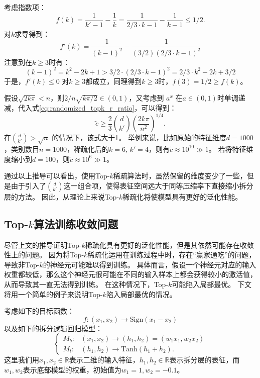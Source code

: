 考虑指数项：
\begin{equation}
    f(k) = \dfrac{1}{k' - 1} - \dfrac{1}{k} = \dfrac{1}{2/3 \cdot k - 1} - \dfrac{1}{k - 1} \le 1/2.
\end{equation}
%
对$k$求导得到：
\begin{equation}
    f'(k) = \dfrac{1}{(k - 1)^2} - \dfrac{1}{(3/2)(2/3 \cdot k - 1)^2}
\end{equation}
%
注意到在$k \ge 3$时有：
\begin{equation}
    (k - 1)^2 = k^2 - 2k + 1 > 3/2 \cdot (2/3\cdot k - 1)^2 = 2/3 \cdot k^2 -2k + 3/2
\end{equation}
%
于是，$f'(k) \le 0$ 对$k \ge 3$都成立，同理得到$k \ge 3$时，$f(3) = 1/2 \ge f(k)$。
%



假设$\sqrt{2k\pi} < n$，则$2/n \sqrt{k\pi/2} \in (0, 1)$，又考虑到 $a^x$ 在$a \in (0, 1)$时单调递减，代入式\eqref{eq:randomized_topk_r_ratio}，可以得到：
\begin{equation}
    \tilde c \ge \dfrac23 {d \choose k'} \left(\dfrac{2k\pi}{n^2}\right)^{1/4}.
\end{equation}
%
在${d \choose k'} > \sqrt{n}$ 的情况下，该式大于1。
%
举例来说，比如原始的特征维度$d = 1000$，类别数目$n = 1000$，稀疏化后的$k = 6$, $k' = 4$，则有$\tilde c \approx 10^{10} \gg 1$。
%
若将特征维度缩小到$d = 100$，则$\tilde c \approx 10^6 \gg 1$。
%

通过以上推导可以看出，使用Top-$k$稀疏算法时，虽然保留的维度变少了一些，但是由于引入了${d \choose k'}$这一组合项，使得表征空间远大于同等压缩率下直接缩小拆分层的方法。
%
因此，从理论上来说Top-$k$稀疏化将使模型具有更好的泛化性能。
%


\subsection{Top-$k$算法训练收敛问题}
尽管上文的推导证明Top-$k$稀疏化具有更好的泛化性能，但是其依然可能存在收敛性上的问题。
因为将Top-$k$稀疏化运用在训练过程中时，存在“赢家通吃”的问题，导致非Top-$k$的神经元可能难以得到训练。
%
具体而言，假设一个神经元对应的输入权重都较低，那么这个神经元很可能在不同的输入样本上都会获得较小的激活值，从而导致其一直无法得到训练。
%
在这种情况下，Top-$k$可能陷入局部最优。
%
下文将用一个简单的例子来说明Top-$k$陷入局部最优的情况。

考虑如下的目标函数：
\begin{equation}
    f: (x_1, x_2) \to \text{Sign}(x_1 - x_2)
\end{equation}
以及如下的拆分逻辑回归模型：
\begin{equation}
\begin{cases}
    M_b: & (x_1, x_2) \to (h_1, h_2) = (w_1x_1, w_2x_2) \\
    M_t: & (h_1, h_2)\rightarrow \text{Tanh}(h_1 + h_2).
\end{cases}
\end{equation}
这里我们用$x_1, x_2 \in \mathbb R$表示二维的输入特征，$h_1, h_2 \in \mathbb R$表示拆分层的表征，而$w_1, w_2$表示底部模型的权重，初始值为$w_1 = 1, w_2 = -0.1$。


